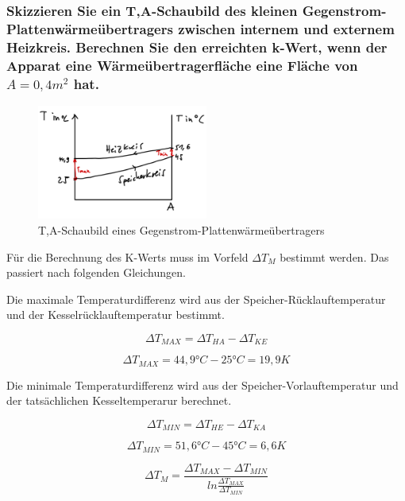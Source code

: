 \subsubsection{Skizzieren Sie ein T,A-Schaubild des kleinen Gegenstrom-Plattenwärmeübertragers
zwischen internem und externem Heizkreis. Berechnen Sie den erreichten k-Wert,
wenn der Apparat eine Wärmeübertragerfläche eine Fläche von \texorpdfstring{$A = 0,4 m^2$}{} hat.}

\begin{figure}[!ht]
    \centering
    \includegraphics[width=0.5\textwidth]{Abbildungen/TA.Diagramm.jpeg}
    \caption{T,A-Schaubild eines Gegenstrom-Plattenwärmeübertragers}
    \label{fig:TA,Diagramm}
\end{figure}

Für die Berechnung des K-Werts muss im Vorfeld $\Delta T_M$ bestimmt werden. Das passiert nach folgenden Gleichungen.

Die maximale Temperaturdifferenz wird aus der Speicher-Rücklauftemperatur und der Kesselrücklauftemperatur bestimmt.

\begin{equation}
    \Delta T_{MAX}= \Delta T_{HA}-\Delta T_{KE}
    \label{eq:230621_DeltaTMAX}
\end{equation}



$$\Delta T_{MAX}= 44,9\text{°}C-25 \text{°} C= 19,9K$$

Die minimale Temperaturdifferenz wird aus der Speicher-Vorlauftemperatur und der tatsächlichen Kesseltemperarur berechnet.

\begin{equation}
    \Delta T_{MIN}= \Delta T_{HE}-\Delta T_{KA}
    \label{eq:230621_DeltaTMIN}
\end{equation}

$$\Delta T_{MIN}= 51,6 \text{°} C-45 \text{°} C= 6,6K$$

\begin{equation}
    \Delta T_{M}= \frac{\Delta T_{MAX}-\Delta T_{MIN}}{ln\frac{\Delta T_{MAX}}{\Delta T_{MIN}}}
    \label{eq:230621_DeltaTM}
\end{equation}

